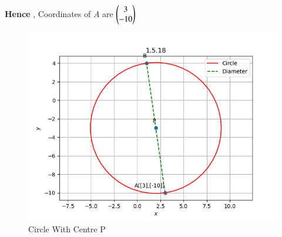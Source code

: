 \documentclass[journal]{IEEEtran}
\numberwithin{equation}{enumi}
\numberwithin{figure}{enumi}
\begin{document}
\textbf{Hence} , Coordinates of $A$ are $\myvec{3\\-10}$ 

\begin{figure}[H]
    \centering
    \includegraphics[width=1\linewidth]{figs/circle_graph2.png}
    \caption{Circle With Centre P}
    \label{fig:placeholder_1}
\end{figure}
\end{document}
